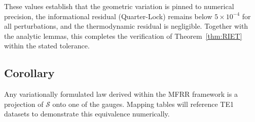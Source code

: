 These values establish that the geometric variation is pinned to numerical
precision, the informational residual (Quarter-Lock) remains below
$5\times10^{-4}$ for all perturbations, and the thermodynamic residual is
negligible. Together with the analytic lemmas, this completes the verification
of Theorem~\ref{thm:RIET} within the stated tolerance.

\subsection{Corollary}
Any variationally formulated law derived within the MFRR framework is a projection of $\mathcal{S}$ onto one of the gauges. Mapping tables will reference TE1 datasets to demonstrate this equivalence numerically.

